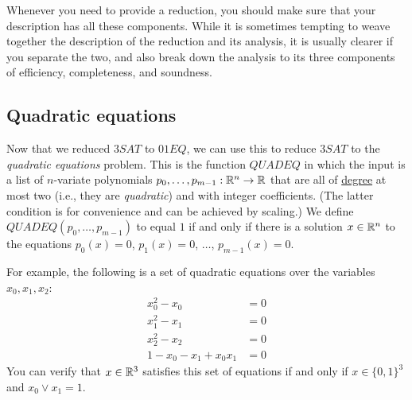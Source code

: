 Whenever you need to provide a reduction, you should make sure that your
description has all these components. While it is sometimes tempting to
weave together the description of the reduction and its analysis, it is
usually clearer if you separate the two, and also break down the
analysis to its three components of efficiency, completeness, and
soundness.

\subsection{Quadratic equations}\label{Quadratic-equations}

Now that we reduced \(3\ensuremath{\mathit{SAT}}\) to
\(01\ensuremath{\mathit{EQ}}\), we can use this to reduce
\(3\ensuremath{\mathit{SAT}}\) to the \emph{quadratic equations}
problem. This is the function \(\ensuremath{\mathit{QUADEQ}}\) in which
the input is a list of \(n\)-variate polynomials
\(p_0,\ldots,p_{m-1}:{\mathbb{R}}^n \rightarrow {\mathbb{R}}\) that are all of
\href{https://en.wikipedia.org/wiki/Degree_of_a_polynomial}{degree} at
most two (i.e., they are \emph{quadratic}) and with integer
coefficients. (The latter condition is for convenience and can be
achieved by scaling.) We define
\(\ensuremath{\mathit{QUADEQ}}(p_0,\ldots,p_{m-1})\) to equal \(1\) if
and only if there is a solution \(x\in {\mathbb{R}}^n\) to the equations
\(p_0(x)=0\), \(p_1(x)=0\), \(\ldots\), \(p_{m-1}(x)=0\).

For example, the following is a set of quadratic equations over the
variables \(x_0,x_1,x_2\): \[
\begin{aligned}
x_0^2 - x_0 &= 0 \\
x_1^2 - x_1 &= 0 \\
x_2^2 - x_2 &= 0 \\
1-x_0-x_1+x_0x_1    &= 0
\end{aligned}
\] You can verify that \(x \in {\mathbb{R}}^3\) satisfies this set of equations if
and only if \(x \in \{0,1\}^3\) and \(x_0 \vee x_1 = 1\).

\hypertarget{quadeq-thm}{}



